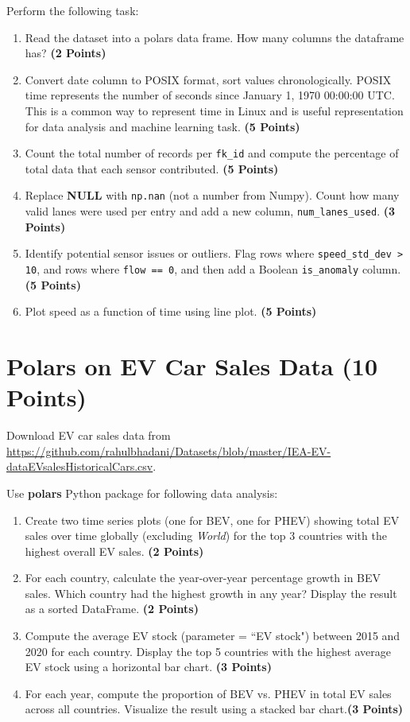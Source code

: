 \documentclass[12pt, xcolor=dvipsnames,svgnames,x11names]{article}
\begin{document}
Perform the following task:

\begin{enumerate}
\item Read the dataset into a polars data frame. How many columns the dataframe has? \textbf{(2 Points)}

\item Convert date column to POSIX format, sort values chronologically. POSIX time represents the number of seconds since January 1, 1970 00:00:00 UTC. This is a common way to represent time in Linux and is  useful representation for data analysis and machine learning task. \textbf{(5 Points)}

\item Count the total number of records per \texttt{fk\_id} and compute the percentage of total data that each sensor
contributed. \textbf{(5 Points)}

\item Replace \textbf{NULL} with \texttt{np.nan} (not a number from Numpy). Count how many valid lanes were used per entry and add a new column,
\texttt{num\_lanes\_used}. \textbf{(3 Points)}

\item Identify potential sensor issues or outliers. Flag rows where \texttt{speed\_std\_dev > 10}, and rows where \texttt{flow ==
0}, and then add a Boolean \texttt{is\_anomaly} column. \textbf{(5 Points)}

\item Plot speed as a function of time using line plot. \textbf{(5 Points)}


\end{enumerate}


\section{Polars on EV Car Sales Data \textbf{(10 Points)}}

Download EV car sales data from \url{https://github.com/rahulbhadani/Datasets/blob/master/IEA-EV-dataEVsalesHistoricalCars.csv}.

Use \textbf{polars} Python package for following data analysis:

\begin{enumerate}
    \item Create two time series plots (one for BEV, one for PHEV) showing total EV sales over time globally (excluding \textit{World}) for the top 3 countries with the highest overall EV sales. \textbf{(2 Points)}
    \item For each country, calculate the year-over-year percentage growth in BEV sales. Which country had the highest growth in any year? Display the result as a sorted DataFrame. \textbf{(2 Points)}
    \item Compute the average EV stock (parameter = ``EV stock") between 2015 and 2020 for each country. Display the top 5 countries with the highest average EV stock using a horizontal bar chart. \textbf{(3 Points)}
    \item For each year, compute the proportion of BEV vs. PHEV in total EV sales across all countries. Visualize the result using a stacked bar chart.\textbf{(3 Points)}
\end{enumerate}
\end{document}
